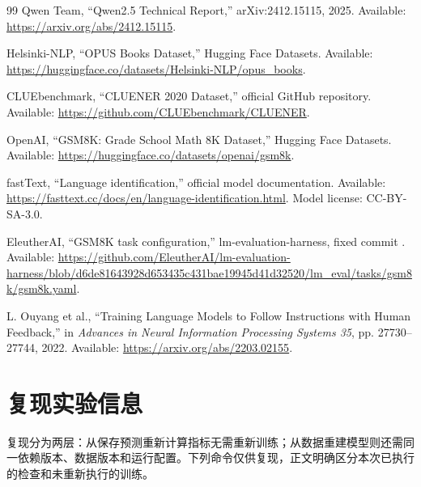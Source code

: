 \documentclass[UTF8,a4paper,12pt,fontset=none]{ctexart}
\begin{document}
\begin{thebibliography}{99}
 Qwen Team, ``Qwen2.5 Technical Report,'' arXiv:2412.15115, 2025. Available: \url{https://arxiv.org/abs/2412.15115}.

 Helsinki-NLP, ``OPUS Books Dataset,'' Hugging Face Datasets. Available: \url{https://huggingface.co/datasets/Helsinki-NLP/opus_books}.

 CLUEbenchmark, ``CLUENER 2020 Dataset,'' official GitHub repository. Available: \url{https://github.com/CLUEbenchmark/CLUENER}.

 OpenAI, ``GSM8K: Grade School Math 8K Dataset,'' Hugging Face Datasets. Available: \url{https://huggingface.co/datasets/openai/gsm8k}.

 fastText, ``Language identification,'' official model documentation. Available: \url{https://fasttext.cc/docs/en/language-identification.html}. Model license: CC-BY-SA-3.0.

 EleutherAI, ``GSM8K task configuration,'' lm-evaluation-harness, fixed commit . Available: \url{https://github.com/EleutherAI/lm-evaluation-harness/blob/d6de81643928d653435c431bae19945d41d32520/lm_eval/tasks/gsm8k/gsm8k.yaml}.

 L. Ouyang et al., ``Training Language Models to Follow Instructions with Human Feedback,'' in \textit{Advances in Neural Information Processing Systems 35}, pp. 27730--27744, 2022. Available: \url{https://arxiv.org/abs/2203.02155}.
\end{thebibliography}

\appendix
\section{复现实验信息}
复现分为两层：从保存预测重新计算指标无需重新训练；从数据重建模型则还需同一依赖版本、数据版本和运行配置。下列命令仅供复现，正文明确区分本次已执行的检查和未重新执行的训练。
\end{document}
